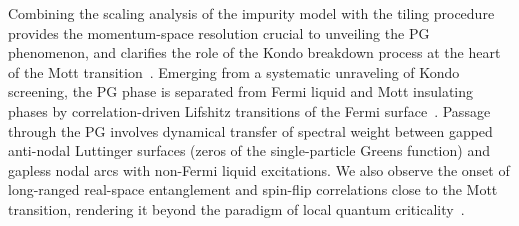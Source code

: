 \documentclass[%
 reprint,
superscriptaddress,
groupedaddress,
 amsmath,amssymb,
 aps,
prl,superscriptaddress
]{revtex4-2}
\begin{document}
Combining the scaling analysis of the impurity model with the tiling procedure provides the momentum-space resolution crucial to unveiling the PG phenomenon, and clarifies the role of the Kondo breakdown process at the heart of the Mott transition~\cite{fabrizio2017kondophysicsmotttransition,RADEMAKER2025}. Emerging from a systematic unraveling of Kondo screening, the PG phase is separated from Fermi liquid and Mott insulating phases by correlation-driven Lifshitz transitions of the Fermi surface~\cite{sakai2009evolution}. Passage through the PG involves dynamical transfer of spectral weight between gapped anti-nodal Luttinger surfaces (zeros of the single-particle Greens function) and gapless nodal arcs with non-Fermi liquid excitations. We also observe the onset of long-ranged real-space entanglement and spin-flip correlations close to the Mott transition, rendering it beyond the paradigm of local quantum criticality~\cite{Si2001}.  
\end{document}
